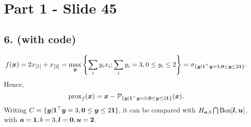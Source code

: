 \section{Part 1 - Slide 45}
%
\subsection{6. (with code)}
%
\begin{equation*}
    f(\boldsymbol x) = 2 x_{[1]} + x_{[2]} 
    = \max_{\boldsymbol y} \left\{ \sum_{i} y_i x_i; \sum_i y_i=3, 0 \le
    y_i \le 2 \right\} = \sigma_{\{ \boldsymbol y|\boldsymbol 1^\top \boldsymbol y = 3, 
    \boldsymbol 0 \le \boldsymbol y \le 2 \boldsymbol 1 \}}.
\end{equation*}
%
Hence,
%
\begin{equation*}
    \operatorname{prox}_f(\boldsymbol x) = \boldsymbol x - \mathcal P_{\{ \boldsymbol y|\boldsymbol 1^\top \boldsymbol y = 3, 
    \boldsymbol 0 \le \boldsymbol y \le 2 \boldsymbol 1 \}} (\boldsymbol x).
\end{equation*}
%
Writing $C=\{ \boldsymbol y|\boldsymbol 1^\top \boldsymbol y = 3, 
\boldsymbol 0 \le \boldsymbol y \le 2 \boldsymbol 1 \}$, it can be compared with 
$H_{\boldsymbol a, b} \bigcap \text{Box}[\boldsymbol l, \boldsymbol u]$, with 
$\boldsymbol a=\boldsymbol 1, b=3, \boldsymbol l=\boldsymbol 0, \boldsymbol u = \boldsymbol 2$.
%
